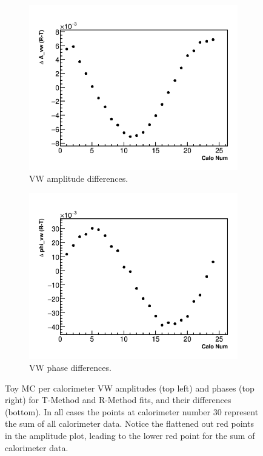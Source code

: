 \documentclass[12pt,letterpaper]{article}
\begin{document}
\begin{figure}[]
    \begin{subfigure}[t]{0.45\textwidth}
        \centering
        \includegraphics[width=\textwidth]{JamesMC_Avw_Diff}
        \caption{VW amplitude differences.}
    \end{subfigure}%
    \hspace{5mm}
    \begin{subfigure}[t]{0.45\textwidth}
        \centering
        \includegraphics[width=\textwidth]{JamesMC_Phivw_Diff}
        \caption{VW phase differences.}
    \end{subfigure}
\caption[]{Toy MC per calorimeter VW amplitudes (top left) and phases (top right) for T-Method and R-Method fits, and their differences (bottom). In all cases the points at calorimeter number 30 represent the sum of all calorimeter data. Notice the flattened out red points in the amplitude plot, leading to the lower red point for the sum of calorimeter data.}
\label{fig:ToyMC_VW_calo_noRand}
\end{figure}
\end{document}
